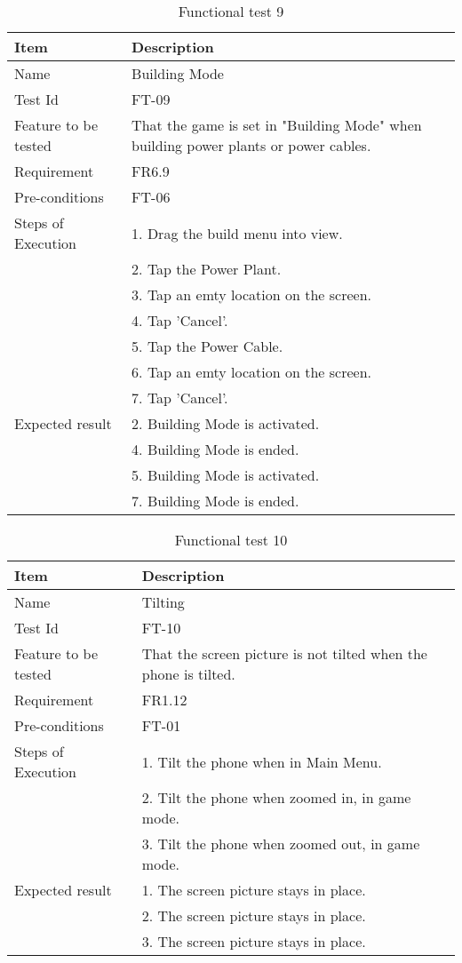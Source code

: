 \begin{table}[H]
\centering
	\begin{tabular}{ l | p{8cm} }
		\hline
		{\bf Item} & {\bf Description} \\ \hline
		Name & Building Mode \\ 
		Test Id & FT-09 \\ 
		Feature to be tested & That the game is set in "Building Mode" when building power plants or power cables. \\ 
		Requirement & FR6.9 \\ 
		Pre-conditions & FT-06 \\ 
		Steps of Execution & 1. Drag the build menu into view. \\ 
		& 2. Tap the Power Plant. \\
		& 3. Tap an emty location on the screen. \\
		& 4. Tap 'Cancel'. \\
		& 5. Tap the Power Cable. \\
		& 6. Tap an emty location on the screen. \\
		& 7. Tap 'Cancel'. \\
		Expected result & 2. Building Mode is activated. \\ 
		& 4. Building Mode is ended. \\
		& 5. Building Mode is activated. \\
		& 7. Building Mode is ended. \\
	\end{tabular}
	\caption{Functional test 9}
\end{table}

\begin{table}[H]
\centering
	\begin{tabular}{ l | p{8cm} }
		\hline
		{\bf Item} & {\bf Description} \\ \hline
		Name & Tilting \\ 
		Test Id & FT-10 \\ 
		Feature to be tested & That the screen picture is not tilted when the phone is tilted. \\ 
		Requirement & FR1.12 \\ 
		Pre-conditions & FT-01 \\ 
		Steps of Execution & 1. Tilt the phone when in Main Menu. \\
		& 2. Tilt the phone when zoomed in, in game mode. \\
		& 3. Tilt the phone when zoomed out, in game mode. \\
		Expected result & 1. The screen picture stays in place. \\ 
		& 2. The screen picture stays in place. \\
		& 3. The screen picture stays in place. \\
	\end{tabular}
	\caption{Functional test 10}
\end{table}

